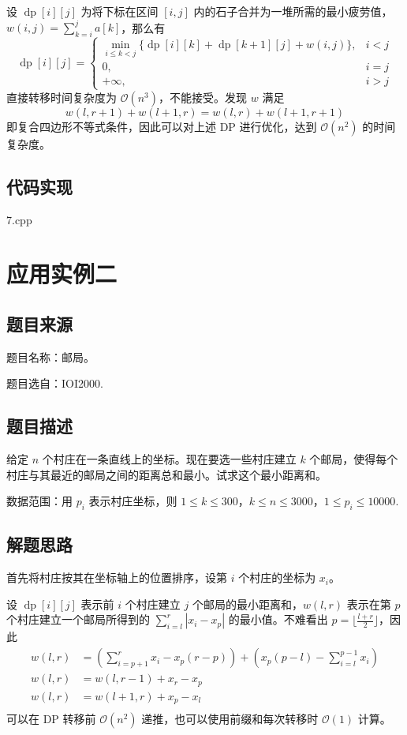 设 \(\operatorname{dp}[i][j]\) 为将下标在区间 \([i,j]\)
内的石子合并为一堆所需的最小疲劳值，\(w(i,j)=\sum_{k=i}^ja[k]\)，那么有
\[
\operatorname{dp}[i][j]=
\left\{
\begin{array}{ll}
\min\limits_{i\le k < j}\{\operatorname{dp}[i][k]+\operatorname{dp}[k+1][j]+w(i,j)\},&i < j\\
0,&i=j\\
+\infty, &i>j
\end{array}
\right.
\] 直接转移时间复杂度为 \(\mathcal{O}(n^3)\)，不能接受。发现 \(w\) 满足
\[
w(l,r+1)+w(l+1,r)=w(l,r)+w(l+1,r+1)
\] 即复合四边形不等式条件，因此可以对上述 DP 进行优化，达到
\(\mathcal{O}(n^2)\) 的时间复杂度。

\subsection{代码实现}

7.cpp

\section{应用实例二}

\subsection{题目来源}

题目名称：邮局。

题目选自：IOI2000.

\subsection{题目描述}

给定 \(n\) 个村庄在一条直线上的坐标。现在要选一些村庄建立 \(k\)
个邮局，使得每个村庄与其最近的邮局之间的距离总和最小。试求这个最小距离和。

数据范围：用 \(p_i\) 表示村庄坐标，则
\(1\le k\le 300\)，\(k\le n\le 3000\)，\(1 \le p_i\le 10000\).

\subsection{解题思路}

首先将村庄按其在坐标轴上的位置排序，设第 \(i\) 个村庄的坐标为 \(x_i\)。

设 \(\operatorname{dp}[i][j]\) 表示前 \(i\) 个村庄建立 \(j\)
个邮局的最小距离和，\(w(l,r)\) 表示在第 \(p\) 个村庄建立一个邮局所得到的
\(\sum_{i=l}^r|x_i-x_p|\) 的最小值。不难看出
\(p=\lfloor \frac{l+r}{2}\rfloor\)，因此 \[
\begin{aligned}
w(l,r)&=(\sum_{i=p+1}^rx_i-x_p(r-p))+(x_p(p-l)-\sum_{i=l}^{p-1}x_i)\\
w(l,r)&=w(l,r-1)+x_r-x_p\\
w(l,r)&=w(l+1,r)+x_p-x_l\\
\end{aligned}
\] 可以在 DP 转移前 \(\mathcal{O}(n^2)\)
递推，也可以使用前缀和每次转移时 \(\mathcal{O}(1)\) 计算。

